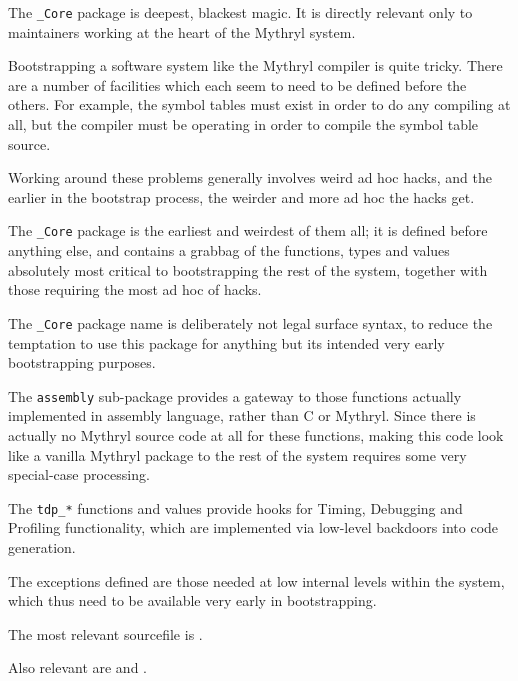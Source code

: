 The {\tt \_Core} package is deepest, blackest magic. It is directly relevant 
only to maintainers working at the heart of the Mythryl system.

Bootstrapping a software system like the Mythryl compiler is quite 
tricky.  There are a number of facilities which each seem to need to be 
defined before the others.  For example, the symbol tables must exist in order 
to do any compiling at all, but the compiler must be operating 
in order to compile the symbol table source.

Working around these problems generally involves weird ad hoc 
hacks, and the earlier in the bootstrap process, the weirder 
and more ad hoc the hacks get.

The {\tt \_Core} package is the earliest and weirdest of them all; 
it is defined before anything else, and contains a grabbag of 
the  functions, types 
and values absolutely most critical to bootstrapping the rest of 
the system, together with those requiring the most ad hoc of hacks.

The {\tt \_Core} package name is deliberately not legal surface 
syntax, to reduce the temptation to use this package for anything 
but its intended very early bootstrapping purposes.

The {\tt assembly} sub-package provides a gateway to those functions 
actually implemented in assembly language, rather than C or Mythryl. 
Since there is actually no Mythryl source code at all for these functions, 
making this code look like a vanilla Mythryl package to the rest 
of the system requires some very special-case processing.

The {\tt tdp\_*} functions and values provide hooks for Timing, 
Debugging and Profiling functionality, which are implemented via 
low-level backdoors into code generation.

The exceptions defined are those needed at low internal levels 
within the system, which thus need to be available very early 
in bootstrapping.

The most relevant sourcefile is 
.

Also relevant are  
and .